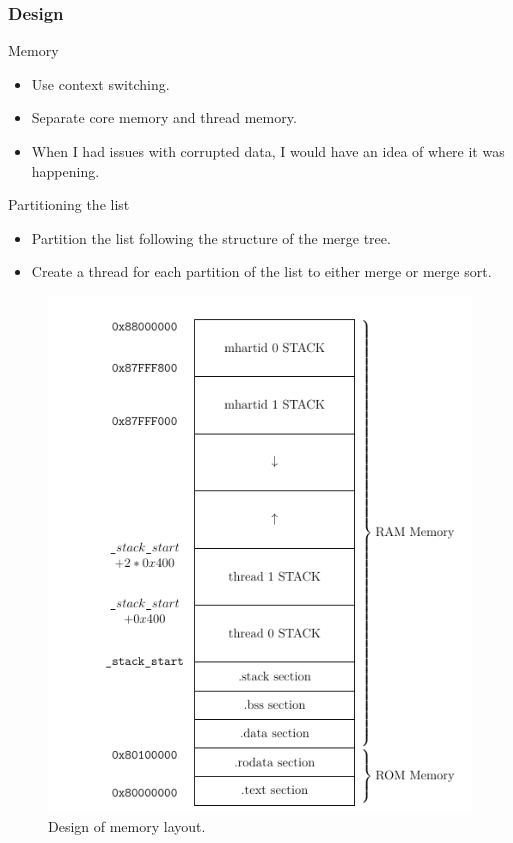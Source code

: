 \begin{frame}[hoved]
	\frametitle{Design}
	\begin{minipage}[t]{0.45\textwidth}
		{\large Memory}
		\begin{itemize}
			\item Use context switching.
			\item Separate core memory and thread memory.
      \item When I had issues with corrupted data, I would have an idea of where
        it was happening.
		\end{itemize}
    {\large Partitioning the list}
    \begin{itemize}
      \item Partition the list following the structure of the merge tree.
      \item Create a thread for each partition of the list to either merge or
        merge sort.
    \end{itemize}
	\end{minipage}
	\hfill
	\begin{minipage}[t]{0.45\textwidth}
		\begin{figure}
			\begin{center}
				\includegraphics[height=0.65\textheight]{figures/memory.png}
			\end{center}
			\caption{Design of memory layout.}\label{fig:mem_layout}
		\end{figure}
	\end{minipage}
\end{frame}
